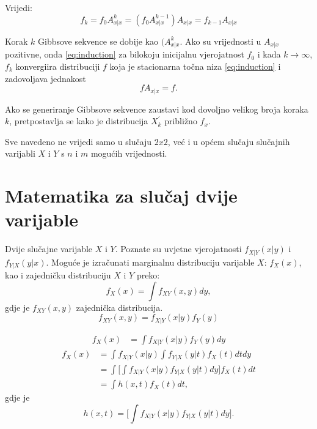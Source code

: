 Vrijedi:
\begin{equation} \label{eq:induction}
f_k = f_0 A_{x|x}^{k} = (f_0 A_{x|x}^{k-1})A_{x|x} = f_{k-1} A_{x|x}
\end{equation}

Korak $k$ Gibbsove sekvence se dobije kao $(A_{x|x}^{k}$. Ako su vrijednosti u $A_{x|x}$ pozitivne, onda \eqref{eq:induction} za bilokoju inicijalnu vjerojatnost $f_0$ i kada $k \to \infty$, $f_k$ konvergiira distribuciji $f$ koja je stacionarna točna niza \eqref{eq:induction} i zadovoljava jednakost
\begin{equation}
fA_{x|x}=f.
\end{equation}

Ako se generiranje Gibbsove sekvence zaustavi kod dovoljno velikog broja koraka $k$, pretpostavlja se kako je distribucija $X^{'}_{k}$ približno $f_x$. 

Sve navedeno ne vrijedi samo u slučaju $2x2$, već i u općem slučaju slučajnih varijabli $X$ i $Y$ s $n$ i $m$ mogućih vrijednosti.

\section{Matematika za slučaj dvije varijable}

Dvije slučajne varijable $X$ i $Y$. Poznate su uvjetne vjerojatnosti $f_{X|Y}(x|y)$ i $f_{Y|X}(y|x)$. Moguće je izračunati marginalnu distribuciju varijable $X$: $f_X(x)$, kao i zajedničku distribuciju $X$ i $Y$ preko:
\begin{equation}
f_X(x) = \int f_{XY}(x,y) dy,
\end{equation}
gdje je $f_{XY}(x,y)$ zajednička distribucija. 
\begin{equation}
f_{XY}(x,y) = f_{X|Y}(x|y) f_Y(y)
\end{equation}

\begin{align*}
f_X(x) &= \int f_{X|Y}(x|y)f_Y(y)dy
\end{align*}
\begin{align*}
f_X(x) &= \int f_{X|Y}(x|y) \int f_{Y|X}(y|t)f_X(t)dt dy \\
&= \int \bigg[ \int f_{X|Y}(x|y)f_{Y|X}(y|t)dy \bigg] f_X(t)dt \\
&= \int h(x,t) f_X(t) dt,
\end{align*}
gdje je 
\begin{equation}
h(x,t) = \bigg[\int f_{X|Y}(x|y)f_{Y|X}(y|t)dy\bigg].
\end{equation}

